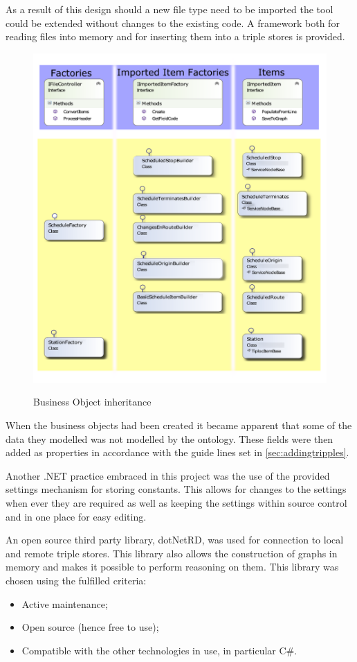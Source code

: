 As a result of this design should a new file type need to be imported the tool could be extended without changes to the existing code. A framework both for reading files into memory and for inserting them into a triple stores is provided.

\begin{figure}[!h]
\myfloatalign
{\includegraphics[width=\linewidth]{gfx/BussinessObjectsCat}} 
\caption{Business Object inheritance}
\label{fig:bo}
\end{figure}

When the business objects had been created it became apparent that some of the data they modelled was not modelled by the ontology. These fields were then added as properties in accordance with the guide lines set in \autoref{sec:addingtripples}.

Another .NET practice embraced in this project was the use of the provided settings mechanism for storing constants. This allows for changes to the settings when ever they are required as well as keeping the settings within source control and in one place for easy editing. 

An open source third party library, dotNetRD, was used for connection to local and remote triple stores. This library also allows the construction of graphs in memory and makes it possible to perform reasoning on them. This library was chosen using the fulfilled criteria:
\begin{itemize}
 \item Active maintenance;
 \item Open source (hence free to use);
 \item Compatible with the other technologies in use, in particular C\#.
\end{itemize}

